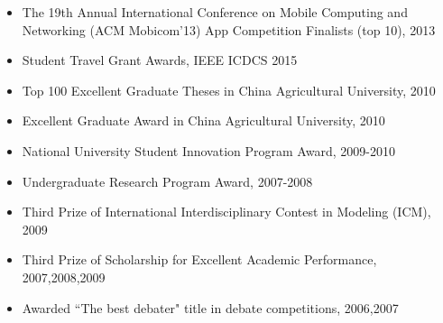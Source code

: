 \documentclass[letter]{article}
\newenvironment{tightitem}
{\begin{itemize}
\setlength{\itemsep}{1pt}
\setlength{\parskip}{0pt}
\setlength{\parsep}{0pt}}
{\end{itemize}}
\begin{document}
\begin{description}
\begin{tightitem}
\item The 19th Annual International Conference on Mobile Computing and Networking (ACM Mobicom'13) App Competition Finalists (top 10), 2013
\item Student Travel Grant Awards, IEEE ICDCS 2015
\item Top 100 Excellent Graduate Theses in China Agricultural University, 2010
\item  Excellent Graduate Award in China Agricultural University, 2010
\item   National University Student Innovation Program Award, 2009-2010
\item  Undergraduate Research Program Award, 2007-2008
\item Third Prize of International Interdisciplinary Contest in Modeling (ICM), 2009
\item  Third Prize of Scholarship for Excellent Academic Performance, 2007,2008,2009
\item Awarded ``The best debater"  title in debate competitions, 2006,2007
\end{tightitem}
\end{description}
\end{document}
